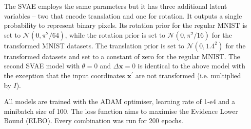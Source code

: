 The SVAE employs the same parameters but it has three additional latent variables -- two that encode translation and one for rotation. It outputs a single probability to represent binary pixels. Its rotation prior for the regular MNIST is set to $\mathcal{N}(0, \pi^2/64)$, while the rotation prior is set to $\mathcal{N}(0, \pi^2/16)$ for the transformed MNIST datasets. The translation prior is set to $\mathcal{N}(0, 1.4^2)$ for the transformed datasets and set to a constant of zero for the regular MNIST. The second SVAE model with $\theta=0$ and $\Delta \textbf{x}=0$ is identical to the above model with the exception that the input coordinates $\textbf{x}^{\prime}$ are not transformed (i.e. multiplied by $I$).

All models are trained with the ADAM optimiser, learning rate of 1-e4 and a minibatch size of 100. The loss function aims to maximise the Evidence Lower Bound (ELBO). Every combination was run for 200 epochs.
